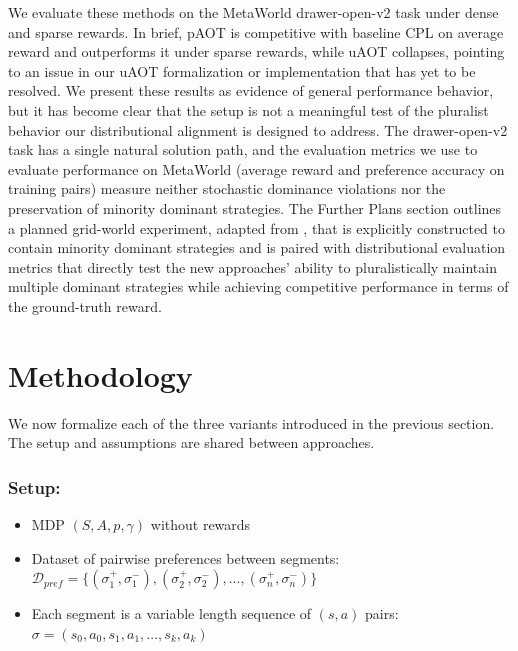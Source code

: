 \documentclass[11pt]{article}
\begin{document}
We evaluate these methods on the MetaWorld drawer-open-v2 task \cite{yu2019metaworld} under dense and sparse rewards. In brief, pAOT is competitive with baseline CPL on average reward and outperforms it under sparse rewards, while uAOT collapses, pointing to an issue in our uAOT formalization or implementation that has yet to be resolved. We present these results as evidence of general performance behavior, but it has become clear that the setup is not a meaningful test of the pluralist behavior our distributional alignment is designed to address. The drawer-open-v2 task has a single natural solution path, and the evaluation metrics we use to evaluate performance on MetaWorld (average reward and preference accuracy on training pairs) measure neither stochastic dominance violations nor the preservation of minority dominant strategies. The Further Plans section outlines a planned grid-world experiment, adapted from \cite{farajzadeh2025psd}, that is explicitly constructed to contain minority dominant strategies and is paired with distributional evaluation metrics that directly test the new approaches' ability to pluralistically maintain multiple dominant strategies while achieving competitive performance in terms of the ground-truth reward.

\newpage
\section{Methodology}
\label{sec:methodology}

We now formalize each of the three variants introduced in the previous section. The setup and assumptions are shared between approaches.

\subsubsection*{Setup:}
\begin{itemize}
    \item MDP $(S,A,p,\gamma)$ without rewards
    \item Dataset of pairwise preferences between segments: $\mathcal{D}_{pref} = \{(\sigma_1^+, \sigma_1^-), (\sigma_2^+, \sigma_2^-), ..., (\sigma_n^+, \sigma_n^-)\}$
    \item Each segment is a variable length sequence of $(s, a)$ pairs: $\sigma = (s_0, a_0, s_1, a_1, ..., s_k, a_k)$

\end{itemize}
\end{document}
